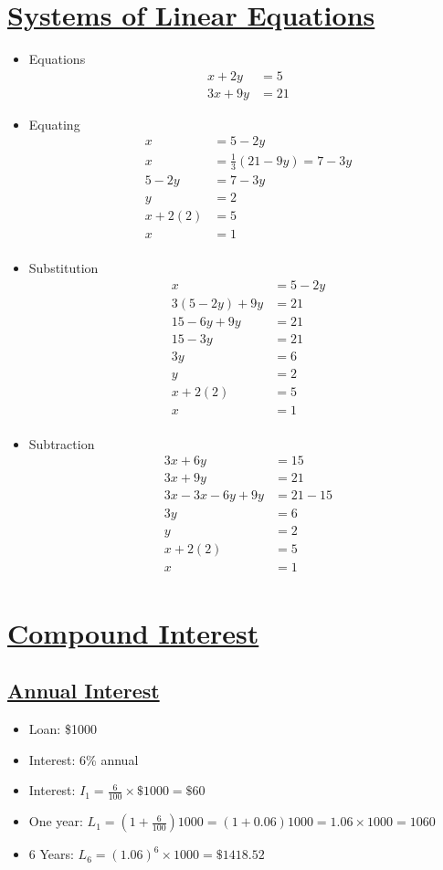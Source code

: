 \documentclass{article}
\begin{document}
\section{\underline{Systems of Linear Equations}}
\begin{itemize}
  \item Equations
  \begin{align*}
    x + 2y &= 5\\
    3x + 9y &= 21
  \end{align*}
  \item Equating
  \begin{align*}
    x &= 5 - 2y\\
    x &= \frac{1}{3}(21 - 9y) = 7 - 3y\\
    5 - 2y &= 7 - 3y\\
    y &= 2\\
    x + 2(2) &= 5\\
    x &= 1\\
  \end{align*}
  \item Substitution
  \begin{align*}
    x &= 5 - 2y\\
    3(5 - 2y) + 9y &= 21\\
    15 - 6y + 9y &= 21\\
    15 - 3y &= 21\\
    3y &= 6\\
    y &= 2\\
    x + 2(2) &= 5\\
    x &= 1\\
  \end{align*}
  \item Subtraction
  \begin{align*}
    3x + 6y &= 15\\
    3x + 9y &= 21\\
    3x - 3x - 6y + 9y &= 21 - 15\\
    3y &= 6\\
    y &= 2\\
    x + 2(2) &= 5\\
    x &= 1\\
  \end{align*}
\end{itemize}
\section{\underline{Compound Interest}}
\subsection{\underline{Annual Interest}}
\begin{itemize}
  \item Loan: \$1000
  \item Interest: 6\% annual
  \item Interest: $I_{1} = \frac{6}{100} \times \$1000 = \$60$
  \item One year: $L_{1} = \left(1 + \frac{6}{100}\right)1000 = (1 + 0.06)1000 = 1.06 \times 1000 = 1060$
  \item 6 Years: $L_{6} = (1.06)^{6} \times 1000 = \$1418.52$
\end{itemize}
\end{document}
